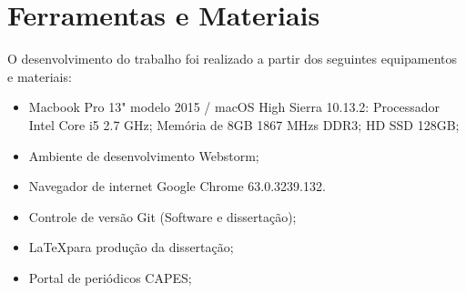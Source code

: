 \begin{figure}[h]
	\centering	
\end{figure}
\FloatBarrier

\section{Ferramentas e Materiais}
O desenvolvimento do trabalho foi realizado a partir dos seguintes equipamentos e materiais:
\begin{itemize}
	\item Macbook Pro 13" modelo 2015 / macOS High Sierra 10.13.2:
	\subitem Processador Intel Core i5 2.7 GHz;
	\subitem Memória de 8GB 1867 MHzs DDR3;
	\subitem HD SSD 128GB;
	\item Ambiente de desenvolvimento Webstorm;
	\item Navegador de internet Google Chrome 63.0.3239.132.
	\item Controle de versão Git (Software e dissertação);
	\item \LaTeX para produção da dissertação;
	\item Portal de periódicos CAPES;
\end{itemize}